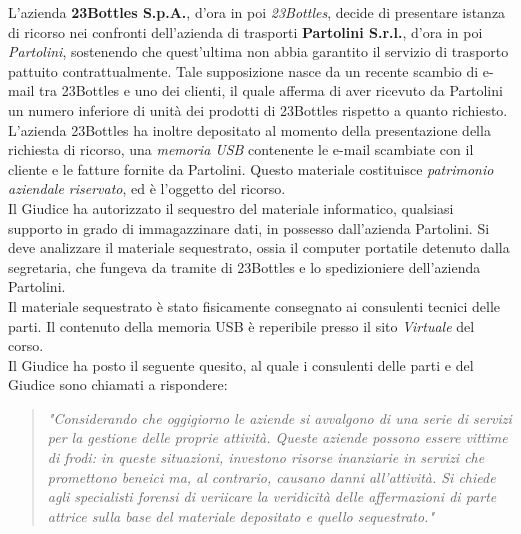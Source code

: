 L’azienda \textbf{23Bottles S.p.A.}, d’ora in poi \textit{23Bottles}, decide di presentare istanza di ricorso nei confronti dell’azienda di trasporti \textbf{Partolini S.r.l.}, d’ora in poi \textit{Partolini}, sostenendo che quest’ultima non abbia garantito il servizio di trasporto pattuito contrattualmente. Tale supposizione nasce da un recente scambio di e-mail tra 23Bottles e uno dei clienti, il quale afferma di aver ricevuto da Partolini un numero inferiore di unità dei prodotti di 23Bottles rispetto a quanto richiesto.\vspace{14pt}\\
L’azienda 23Bottles ha inoltre depositato al momento della presentazione della richiesta di ricorso, una \textit{memoria USB} contenente le e-mail scambiate con il cliente e le fatture fornite da Partolini. Questo materiale costituisce \textit{patrimonio aziendale riservato}, ed è l’oggetto del ricorso.\vspace{14pt}\\
Il Giudice ha autorizzato il sequestro del materiale informatico, qualsiasi supporto in grado di immagazzinare dati, in possesso dall’azienda Partolini. Si deve analizzare il materiale sequestrato, ossia il computer portatile detenuto dalla segretaria, che fungeva da tramite di 23Bottles e lo spedizioniere dell’azienda Partolini.\vspace{14pt}\\
Il materiale sequestrato è stato fisicamente consegnato ai consulenti tecnici delle parti. Il contenuto della memoria USB è reperibile presso il sito \textit{Virtuale} del corso.\vspace{14pt}\\
Il Giudice ha posto il seguente quesito, al quale i consulenti delle parti e del Giudice sono chiamati a rispondere:
\begin{quote}
    \textit{"Considerando che oggigiorno le aziende si avvalgono di una serie di
    servizi per la gestione delle proprie attività. Queste aziende possono essere
    vittime di frodi: in queste situazioni, investono risorse inanziarie in servizi
    che promettono beneici ma, al contrario, causano danni all’attività. 
    Si chiede agli specialisti forensi di veriicare la veridicità delle
    affermazioni di parte attrice sulla base del materiale depositato e quello
    sequestrato."}
\end{quote}